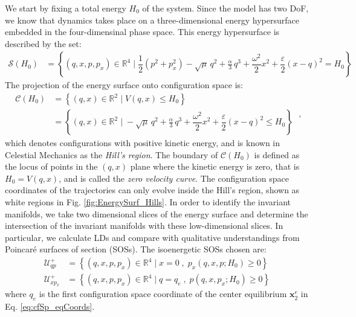 \documentclass[8pt]{article}
\begin{document}
\smallskip

We start by fixing a total energy $H_0$ of the system. Since the model has two DoF, we know that dynamics takes place on a three-dimensional energy hypersurface embedded in the four-dimensinal phase space. This energy hypersurface is described by the set:
\begin{equation}
\begin{split}
\mathcal{S}(H_0) &= \left\lbrace (q,x,p,p_x) \in \mathbb{R}^4 \; \big|\; \dfrac{1}{2} \left(p^2 + p_x^2 \right) - \sqrt{\mu} \, q^2 + \frac{\alpha}{3} \,q^3 + \dfrac{\omega^2}{2} x^2 + \dfrac{\varepsilon}{2} \left(x-q\right)^2 = H_0 \right\rbrace
\end{split}
\end{equation}
The projection of the energy surface onto configuration space is:
\begin{equation}
\begin{split}
\mathcal{C}(H_0) &= \left\lbrace (q,x) \in \mathbb{R}^2 \; \big|\; V(q,x) \leqslant H_0 \right\rbrace \\ 
&= \left\lbrace (q,x) \in \mathbb{R}^2 \; \big|\; - \sqrt{\mu} \, q^2 + \frac{\alpha}{3} \,q^3 + \dfrac{\omega^2}{2} x^2 + \dfrac{\varepsilon}{2} \left(x-q\right)^2 \leqslant H_0 \right\rbrace
\end{split} \;,
\label{eq:hillsreg}
\end{equation}
which denotes configurations with positive kinetic energy, and is known in Celestial Mechanics as the \textit{Hill's region}. The boundary of $\mathcal{C}(H_0)$ is defined as the locus of points in the $(q,x)$ plane where the kinetic energy is zero, that is $H_0 = V(q,x)$, and is called the \textit{zero velocity curve}. The configuration space coordinates of the trajectories can only evolve inside the Hill's region, shown as white regions in Fig. \ref{fig:EnergySurf_Hills}. In order to identify the invariant manifolds, we take two dimensional slices of the energy surface and determine the intersection of the invariant manifolds with these low-dimensional slices. In particular, we calculate LDs and compare with qualitative understandings from Poincar\'e surfaces of section (SOSs). The isoenergetic SOSs chosen are:
\begin{align}
\mathcal{U}_{qp}^{+} &= \left\lbrace (q,x,p,p_x) \in \mathbb{R}^4 \; \big| \; x = 0 \; ,\; p_x(q,x,p;H_0) \geq 0 \right\rbrace \label{eq:sos_qp} \\[.1cm]
\mathcal{U}_{xp_x}^{+} &= \left\lbrace (q,x,p,p_x) \in \mathbb{R}^4 \; \big| \; q = q_e \; , \; p(q,x,p_x;H_0) \geq 0 \right\rbrace 
\label{eq:sos_xpx}
\end{align}
where $q_e$ is the first configuration space coordinate of the center equilibrium $\mathbf{x}_2^e$ in Eq. \eqref{eq:cfSp_eqCoords}.
\end{document}
